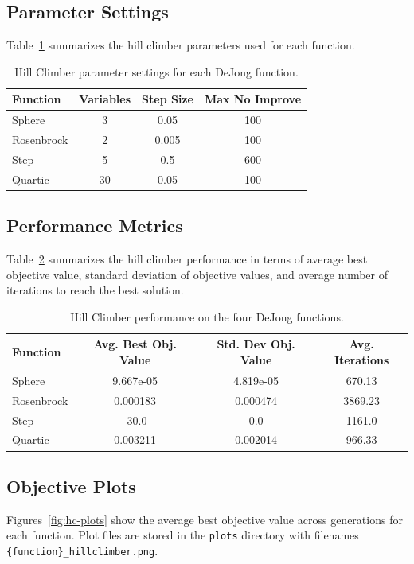 \documentclass[11pt]{article}
\begin{document}
\newpage
\subsection{Parameter Settings}
Table~\ref{tab:hc-params} summarizes the hill climber parameters used for each function.

\begin{table}[H]
\centering
\caption{Hill Climber parameter settings for each DeJong function.}
\label{tab:hc-params}
\begin{tabular}{lccc}
\toprule
Function & Variables & Step Size & Max No Improve \\
\midrule
Sphere      & 3  & 0.05  & 100 \\
Rosenbrock  & 2  & 0.005 & 100 \\
Step        & 5  & 0.5   & 600 \\
Quartic     & 30 & 0.05  & 100 \\
\bottomrule
\end{tabular}
\end{table}

\subsection{Performance Metrics}
Table~\ref{tab:hc-performance} summarizes the hill climber performance in terms of average best objective value, standard deviation of objective values, and average number of iterations to reach the best solution.

\begin{table}[H]
\centering
\caption{Hill Climber performance on the four DeJong functions.}
\label{tab:hc-performance}
\begin{tabular}{lccc}
\toprule
Function & Avg. Best Obj. Value & Std. Dev Obj. Value & Avg. Iterations \\
\midrule
Sphere      & 9.667e-05  & 4.819e-05 & 670.13 \\
Rosenbrock  & 0.000183   & 0.000474  & 3869.23 \\
Step        & -30.0      & 0.0       & 1161.0 \\
Quartic     & 0.003211   & 0.002014  & 966.33 \\
\bottomrule
\end{tabular}
\end{table}

\newpage
\subsection{Objective Plots}
Figures~\ref{fig:hc-plots} show the average best objective value across generations for each function. Plot files are stored in the \texttt{plots} directory with filenames \texttt{\{function\}\_hillclimber.png}.
\end{document}
